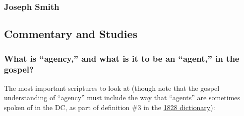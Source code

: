 	\subsubsection{Joseph Smith} %
		\label{AGENCY-JS}
	
		\begin{compactdesc}
			\item[{\hyperref[EMS-1839-JS-8-DEC-1839]{Letter, 8 December 1839}}]
		\end{compactdesc}
	
	
	
\subsection{Commentary and Studies} %
	\label{AGENCY-COMMENTARY}

	
		
	\subsubsection{What is ``agency,'' and what is it to be an ``agent,'' in the gospel?}
		\label{AGENCY-definition}
		
		The most important scriptures to look at (though note that the gospel understanding of ``agency'' must include the way that ``agents'' are sometimes spoken of in the DC, as part of definition \#3 in the \hyperref[AGENCY-1828]{1828 dictionary}): 
		
